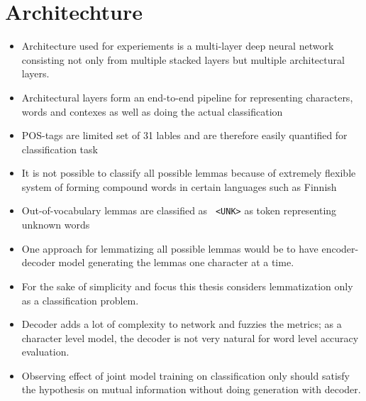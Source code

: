 \documentclass[12pt,a4paper,english
]{tutthesis}
\begin{document}
\section{Architechture}
\label{se:architecture}
\begin{itemize}
\item Architecture used for experiements is a multi-layer deep neural network consisting not only from multiple stacked layers but multiple architectural layers.
\item Architectural layers form an end-to-end pipeline for representing characters, words and contexes as well as doing the actual classification
\item POS-tags are limited set of 31 lables and are therefore easily quantified for classification task
\item It is not possible to classify all possible lemmas because of extremely flexible system of forming compound words in certain languages such as Finnish
\item Out-of-vocabulary lemmas are classified as \verb£ <UNK>£ as token representing unknown words
\item One approach for lemmatizing all possible lemmas would be to have encoder-decoder model generating the lemmas one character at a time.
\item For the sake of simplicity and focus this thesis considers lemmatization only as a classification problem.
\item Decoder adds a lot of complexity to network and fuzzies the metrics; as a character level model, the decoder is not very natural for word level accuracy evaluation.
\item Observing effect of joint model training on classification only should satisfy the hypothesis on mutual information without doing generation with decoder.
\end{itemize}
\end{document}
